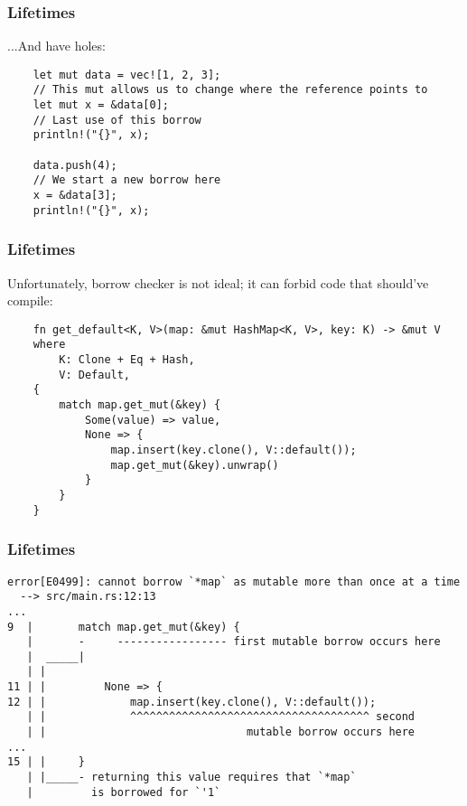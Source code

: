 \documentclass[aspectratio=1610,t]{beamer}
\begin{document}

\begin{frame}[fragile]
\frametitle{Lifetimes}
...And have holes:

\begin{verbatim}
    let mut data = vec![1, 2, 3];
    // This mut allows us to change where the reference points to
    let mut x = &data[0];
    // Last use of this borrow
    println!("{}", x);

    data.push(4);
    // We start a new borrow here
    x = &data[3];
    println!("{}", x);
\end{verbatim}

\end{frame}


\begin{frame}[fragile]
\frametitle{Lifetimes}
Unfortunately, borrow checker is not ideal; it can forbid code that should've compile:

\begin{verbatim}
    fn get_default<K, V>(map: &mut HashMap<K, V>, key: K) -> &mut V
    where
        K: Clone + Eq + Hash,
        V: Default,
    {
        match map.get_mut(&key) {
            Some(value) => value,
            None => {
                map.insert(key.clone(), V::default());
                map.get_mut(&key).unwrap()
            }
        }
    }
\end{verbatim}
\end{frame}


\begin{frame}[fragile,c]
\frametitle{Lifetimes}
\begin{verbatim}
error[E0499]: cannot borrow `*map` as mutable more than once at a time
  --> src/main.rs:12:13
...
9  |       match map.get_mut(&key) {
   |       -     ----------------- first mutable borrow occurs here
   |  _____|
   | |
11 | |         None => {
12 | |             map.insert(key.clone(), V::default());
   | |             ^^^^^^^^^^^^^^^^^^^^^^^^^^^^^^^^^^^^^ second
   | |                               mutable borrow occurs here
...
15 | |     }
   | |_____- returning this value requires that `*map`
   |         is borrowed for `'1`
\end{verbatim}
\end{frame}
\end{document}
